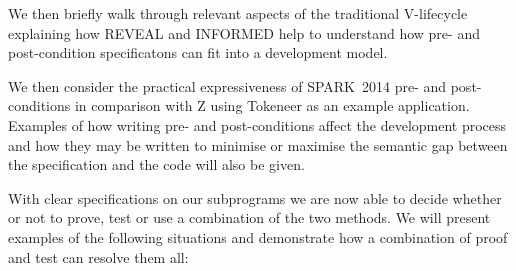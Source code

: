 \documentclass{llncs}
\newcommand{\newspark}{SPARK~2014\xspace}
\begin{document}
We then briefly walk through relevant aspects of the traditional 
V-lifecycle explaining how REVEAL \cite{reveal} and INFORMED 
\cite{informed} help to understand how pre- and post-condition
specificatons can fit into a development model.

We then consider the practical expressiveness of \newspark pre- and
post-conditions in comparison with Z using Tokeneer as an example
application. Examples of how writing pre- and post-conditions affect the
development process and how they may be written to minimise or maximise
the semantic gap between the specification and the code will also be given.

With clear specifications on our subprograms we are now able to decide
whether or not to prove, test or use a combination of the two methods.
We will present examples of the following situations and demonstrate how
a combination of proof and test can resolve them all:
\end{document}
